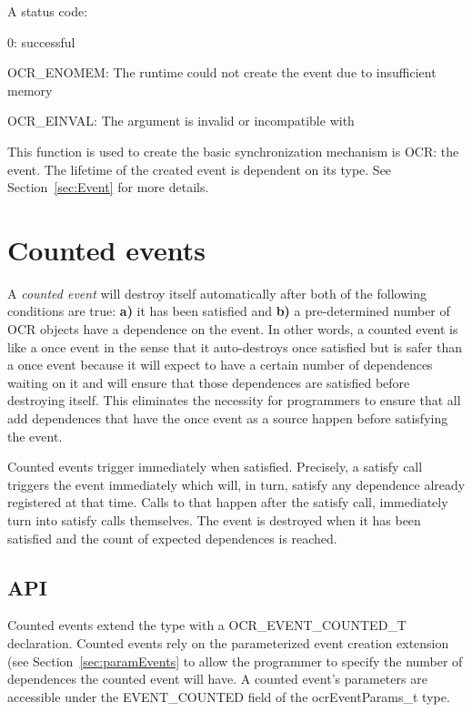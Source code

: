 \returns
A status code:
\begin{DoxyItemize}
\item 0\-: successful
\item OCR\_ENOMEM: The runtime could not create the event due to insufficient memory
\item OCR\_EINVAL: The  argument is invalid or incompatible
  with 
\end{DoxyItemize}

\descr
This function is used to create the basic synchronization mechanism is
OCR: the event. The lifetime of the created event is dependent on its
type. See Section~\ref{sec:Event} for more details.

\section{Counted events}
\label{sec:countedEvents}
A \emph{counted event} will destroy itself
automatically after both of the following conditions are true: {\bf
  a)} it has been satisfied and {\bf b)} a pre-determined number of
OCR objects have a dependence on the event. In other words, a counted
event is like a once event in the sense that it auto-destroys once
satisfied but is safer than a once event because it will expect to
have a certain number of dependences waiting on it and will ensure
that those dependences are satisfied before destroying itself. This
eliminates the necessity for programmers to ensure that all add
dependences that have the once event as a source happen before
satisfying the event.

Counted events trigger immediately when satisfied. Precisely, a
satisfy call triggers the event immediately which will, in turn,
satisfy any dependence already registered at that time. Calls to
\hyperlink{func_ocrAddDependence}{} that happen
after the satisfy call, immediately turn into satisfy calls
themselves. The event is destroyed when it has been satisfied and the
count of expected dependences is reached.

\subsection{API}

Counted events extend the
\hyperlink{type_ocrEventTypes_t}{} type
with a OCR\_EVENT\_COUNTED\_T declaration. Counted events rely on the
parameterized event creation extension (see
Section~\ref{sec:paramEvents} to allow the programmer to
specify the number of dependences the counted event will have. A
counted event's parameters are accessible under the EVENT\_COUNTED field
of the ocrEventParams\_t type.

